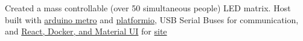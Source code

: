 {Created a mass controllable (over 50 simultaneous people) LED matrix. Host built with \href{https://www.adafruit.com/product/2488}{arduino metro} and \href{https://platformio.org/}{platformio}, USB Serial Buses for communication, and \href{https://github.com/sachiniyer/control_display/tree/main/control_display_site}{React, Docker, and Material UI} for \href{https://school-demo.sachiniyer.com/}{site}}
